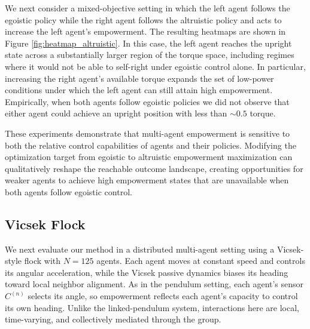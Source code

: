\documentclass{article} %
\begin{document}
We next consider a mixed-objective setting in which the left agent follows the egoistic policy while the right agent follows the altruistic policy and acts to increase the left agent's empowerment. The resulting heatmaps are shown in Figure \ref{fig:heatmap_altruistic}. In this case, the left agent reaches the upright state across a substantially larger region of the torque space, including regimes where it would not be able to self-right under egoistic control alone. In particular, increasing the right agent's available torque expands the set of low-power conditions under which the left agent can still attain high empowerment. Empirically, when both agents follow egoistic policies we did not observe that either agent could achieve an upright position with less than $\sim0.5$ torque.

These experiments demonstrate that multi-agent empowerment is sensitive to both the relative control capabilities of agents and their policies. Modifying the optimization target from egoistic to altruistic empowerment maximization can qualitatively reshape the reachable outcome landscape, creating opportunities for weaker agents to achieve high empowerment states that are unavailable when both agents follow egoistic control.

\subsection{Vicsek Flock}

We next evaluate our method in a distributed multi-agent setting using a Vicsek-style flock \citep{vicsek_1995, Ferretti_2022} with $N=125$ agents. Each agent moves at constant speed and controls its angular acceleration, while the Vicsek passive dynamics biases its heading toward local neighbor alignment. As in the pendulum setting, each agent's sensor $C^{(n)}$ selects its angle, so empowerment reflects each agent's capacity to control its own heading. Unlike the linked-pendulum system, interactions here are local, time-varying, and collectively mediated through the group.
\end{document}
